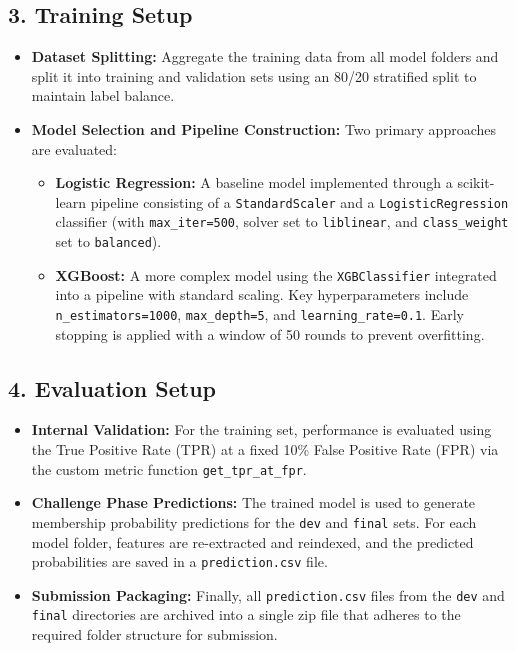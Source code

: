 \documentclass[12pt]{article}
\begin{document}
\subsection*{3. Training Setup}
\begin{itemize}
    \item \textbf{Dataset Splitting:}  
    Aggregate the training data from all model folders and split it into training and validation sets using an 80/20 stratified split to maintain label balance.
    
    \item \textbf{Model Selection and Pipeline Construction:}  
    Two primary approaches are evaluated:
    \begin{itemize}
        \item \textbf{Logistic Regression:}  
        A baseline model implemented through a scikit-learn pipeline consisting of a \texttt{StandardScaler} and a \texttt{LogisticRegression} classifier (with \texttt{max\_iter=500}, solver set to \texttt{liblinear}, and \texttt{class\_weight} set to \texttt{balanced}).
        
        \item \textbf{XGBoost:}  
        A more complex model using the \texttt{XGBClassifier} integrated into a pipeline with standard scaling. Key hyperparameters include \texttt{n\_estimators=1000}, \texttt{max\_depth=5}, and \texttt{learning\_rate=0.1}. Early stopping is applied with a window of 50 rounds to prevent overfitting.
    \end{itemize}
\end{itemize}

\subsection*{4. Evaluation Setup}
\begin{itemize}
    \item \textbf{Internal Validation:}  
    For the training set, performance is evaluated using the True Positive Rate (TPR) at a fixed 10\% False Positive Rate (FPR) via the custom metric function \texttt{get\_tpr\_at\_fpr}.
    
    \item \textbf{Challenge Phase Predictions:}  
    The trained model is used to generate membership probability predictions for the \texttt{dev} and \texttt{final} sets. For each model folder, features are re-extracted and reindexed, and the predicted probabilities are saved in a \texttt{prediction.csv} file.
    
    \item \textbf{Submission Packaging:}  
    Finally, all \texttt{prediction.csv} files from the \texttt{dev} and \texttt{final} directories are archived into a single zip file that adheres to the required folder structure for submission.
\end{itemize}
\end{document}
